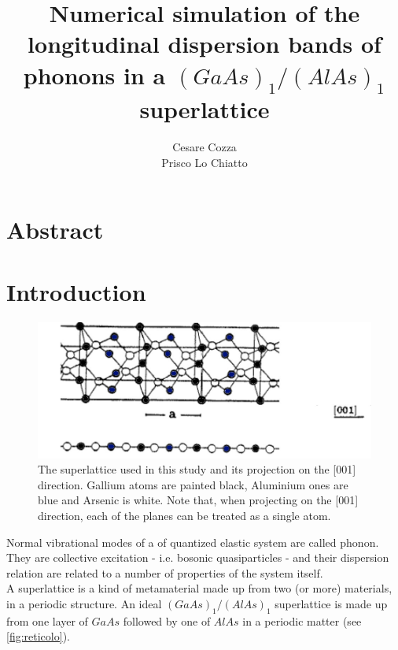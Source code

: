 \documentclass{article}
\begin{document}
 
	
	\author{Cesare Cozza \\ Prisco Lo Chiatto }
	\title{Numerical simulation of the longitudinal dispersion bands of phonons in a $(GaAs)_1/(AlAs)_1$ superlattice}
	\maketitle
    \newpage
    
    
\section{Abstract}




\section{Introduction}
\begin{figure}
	\centering
	\includegraphics[scale=0.3]{reticolo.jpg}
	\caption{The superlattice used in this study and its projection on the [001] direction. Gallium atoms are painted black, Aluminium ones are blue and Arsenic is white. Note that, when projecting on the [001] direction, each of the planes can be treated as a single atom.}
	\label{fig:reticolo}
\end{figure}
Normal vibrational modes of a of quantized elastic system are called phonon. They are collective excitation - i.e. bosonic quasiparticles - and their dispersion relation are related to a number of properties of the system itself. \\
A superlattice is a kind of metamaterial made up from two (or more) materials, in a periodic structure. An ideal $(GaAs)_1/(AlAs)_1$ superlattice is made up from one layer of $GaAs$ followed by one of $AlAs$ in a periodic matter (see \autoref{fig:reticolo}).\smallskip
\end{document}
